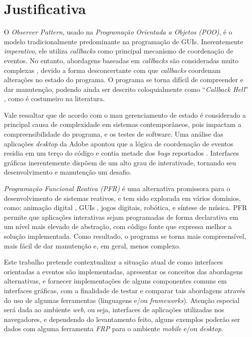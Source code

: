 \section{Justificativa}\label{ljustificativa}


O \emph{Observer Pattern}, usado na \emph{Programação Orientada
a Objetos (POO)}, é o modelo tradicionalmente predominante na
programação de GUIs.
Inerentemente \emph{imperativo}, ele utiliza \emph{callbacks}
como principal mecanismo de coordenação de eventos.
No entanto, abordagens baseadas em \emph{callbacks} são
consideradas muito complexas \cite{
  edwards2009coherent,
  fischer2007tasks,
  maier2010deprecating,
  reppy1992higher},
devido a forma desconcertante com que \emph{callbacks}
coordenam alterações no estado do programa.
O programa se torna difícil de compreender e dar manutenção,
podendo ainda ser descrito coloquialmente como \enquote{\emph{Callback Hell}}
\cite[p.~2]{edwards2009coherent}, como é costumeiro na literatura.

Vale ressaltar que de acordo com 
o mau gerenciamento de estado é considerado a principal
causa de complexidade em sistemas contemporâneos, pois
impactam a compreensibilidade do programa, e os testes
de software.
Uma análise das aplicações \emph{desktop} da Adobe
apontou que a lógica de coordenação de eventos residia
em um terço do código e contia metade dos \emph{bugs}
reportados \cite{jarvi2008property}.
Interfaces gráficas inerentemente dispõem de um alto
grau de interativade, tornando seu desenvolvimento e
manutenção um desafio.

\emph{Programação Funcional Reativa (PFR)} é uma alternativa promissora para o
desenvolvimento de sistemas reativos, e tem sido explorada em vários domínios,
como: animação digital \cite{Elliott-H:1997:Fran}, GUIs \cite{Czaplicki:2012:Elm},
jogos digitais, robótica, e síntese de música.
PFR permite que aplicações interativas sejam programadas de forma declarativa
em um nível mais elevado de abstração, com código fonte que expressa melhor a
solução implementada.
Como resultado, o programa se torna mais compreensível, mais fácil de dar
manutenção e, em geral, menos complexo.

Este trabalho pretende contextualizar a situação atual
de como interfaces orientadas a eventos são implementadas,
apresentar os conceitos das abordagens alternativas, e
fornecer implementações de alguns componentes comuns em
interfaces gráficas, com a finalidade de testar e comparar
tais abordagens através do uso de algumas ferramentas
(linguagens e/ou \emph{frameworks}). Atenção especial será
dada ao ambiente \emph{web}, ou seja, interfaces de
aplicações utilizadas nos navegadores, e dependendo do
levantamento feito, alguns exemplos poderão ser dados
com alguma ferramenta \emph{FRP} para o ambiente
\emph{mobile} e/ou \emph{desktop}.

